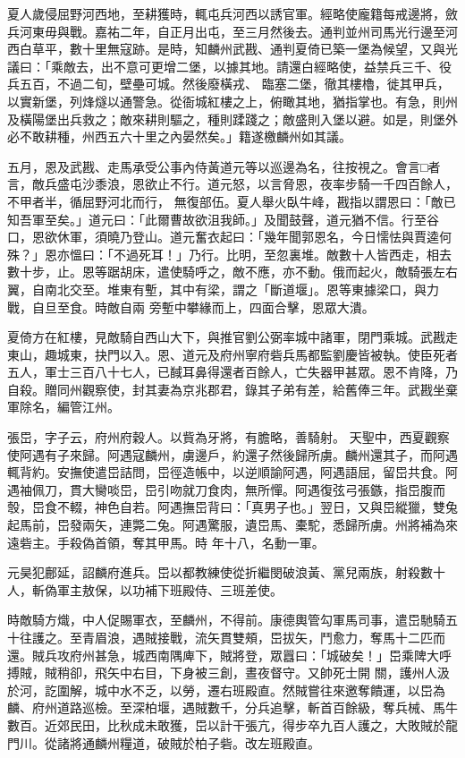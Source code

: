 \begin{pinyinscope}
 夏人歲侵屈野河西地，至耕獲時，輒屯兵河西以誘官軍。經略使龐籍每戒邊將，斂兵河東毋與戰。嘉祐二年，自正月出屯，至三月然後去。通判並州司馬光行邊至河西白草平，數十里無寇跡。是時，知麟州武戡、通判夏倚已築一堡為候望，又與光議曰：「乘敵去，出不意可更增二堡，以據其地。請還白經略使，益禁兵三千、役兵五百，不過二旬，壁壘可城。然後廢橫戎、
 臨塞二堡，徹其樓櫓，徙其甲兵，以實新堡，列烽燧以通警急。從衙城紅樓之上，俯瞰其地，猶指掌也。有急，則州及橫陽堡出兵救之；敵來耕則驅之，種則蹂踐之；敵盛則入堡以避。如是，則堡外必不敢耕種，州西五六十里之內晏然矣。」籍遂檄麟州如其議。



 五月，恩及武戡、走馬承受公事內侍黃道元等以巡邊為名，往按視之。會言□者言，敵兵盛屯沙黍浪，恩欲止不行。道元怒，以言脅恩，夜率步騎一千四百餘人，不甲者半，循屈野河北而行，
 無復部伍。夏人舉火臥牛峰，戡指以謂恩曰：「敵已知吾軍至矣。」道元曰：「此爾曹故欲沮我師。」及聞鼓聲，道元猶不信。行至谷口，恩欲休軍，須曉乃登山。道元奮衣起曰：「幾年聞郭恩名，今日懦怯與賈逵何殊？」恩亦慍曰：「不過死耳！」乃行。比明，至忽裏堆。敵數十人皆西走，相去數十步，止。恩等踞胡床，遣使騎呼之，敵不應，亦不動。俄而起火，敵騎張左右翼，自南北交至。堆東有塹，其中有梁，謂之「斷道堰」。恩等東據梁口，與力戰，自旦至食。時敵自兩
 旁塹中攀緣而上，四面合擊，恩眾大潰。



 夏倚方在紅樓，見敵騎自西山大下，與推官劉公弼率城中諸軍，閉門乘城。武戡走東山，趣城東，抉門以入。恩、道元及府州寧府砦兵馬都監劉慶皆被執。使臣死者五人，軍士三百八十七人，已馘耳鼻得還者百餘人，亡失器甲甚眾。恩不肯降，乃自殺。贈同州觀察使，封其妻為京兆郡君，錄其子弟有差，給舊俸三年。武戡坐棄軍除名，編管江州。



 張岊，字子云，府州府穀人。以貲為牙將，有膽略，善騎射。
 天聖中，西夏觀察使阿遇有子來歸。阿遇寇麟州，虜邊戶，約還子然後歸所虜。麟州還其子，而阿遇輒背約。安撫使遣岊詰問，岊徑造帳中，以逆順諭阿遇，阿遇語屈，留岊共食。阿遇袖佩刀，貫大臠啖岊，岊引吻就刀食肉，無所憚。阿遇復弦弓張鏃，指岊腹而彀，岊食不輟，神色自若。阿遇撫岊背曰：「真男子也。」翌日，又與岊縱獵，雙兔起馬前，岊發兩矢，連斃二兔。阿遇驚服，遺岊馬、橐駝，悉歸所虜。州將補為來遠砦主。手殺偽首領，奪其甲馬。時
 年十八，名動一軍。



 元昊犯鄜延，詔麟府進兵。岊以都教練使從折繼閔破浪黃、黨兒兩族，射殺數十人，斬偽軍主敖保，以功補下班殿侍、三班差使。



 時敵騎方熾，中人促賜軍衣，至麟州，不得前。康德輿管勾軍馬司事，遣岊馳騎五十往護之。至青眉浪，遇賊接戰，流矢貫雙頰，岊拔矢，鬥愈力，奪馬十二匹而還。賊兵攻府州甚急，城西南隅庳下，賊將登，眾囂曰：「城破矣！」岊乘陴大呼搏賊，賊稍卻，飛矢中右目，下身被三創，晝夜督守。又帥死士開
 關，護州人汲於河，訖圍解，城中水不乏，以勞，遷右班殿直。然賊嘗往來邀奪饋運，以岊為麟、府州道路巡檢。至深柏堰，遇賊數千，分兵追擊，斬首百餘級，奪兵械、馬牛數百。近郊民田，比秋成未敢獲，岊以計干張亢，得步卒九百人護之，大敗賊於龍門川。從諸將通麟州糧道，破賊於柏子砦。改左班殿直。




\end{pinyinscope}
